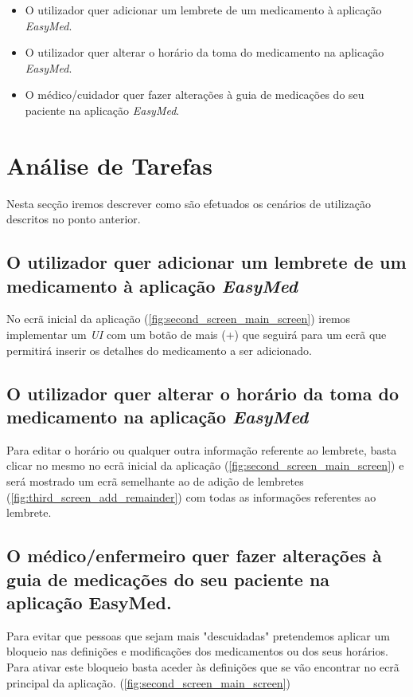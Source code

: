 \documentclass[a4paper]{article}
\begin{document}
\begin{itemize}
    \item O utilizador quer adicionar um lembrete de um medicamento à aplicação \textit{EasyMed}.
    \item O utilizador quer alterar o horário da toma do medicamento na aplicação \textit{EasyMed}.
    \item O médico/cuidador quer fazer alterações à guia de medicações do seu paciente na aplicação \textit{EasyMed}.
\end{itemize}

\section{Análise de Tarefas}\label{section:chores_analysis}
Nesta secção iremos descrever como são efetuados os cenários de utilização descritos no ponto anterior.

\subsection{O utilizador quer adicionar um lembrete de um medicamento à aplicação \textit{EasyMed}}
No ecrã inicial da aplicação (\ref{fig:second_screen_main_screen}) iremos implementar um \textit{UI} com um botão de mais (+) que seguirá para um ecrã que permitirá inserir os detalhes do medicamento a ser adicionado.

\subsection{O utilizador quer alterar o horário da toma do medicamento na aplicação \textit{EasyMed}}
Para editar o horário ou qualquer outra informação referente ao lembrete, basta clicar no mesmo no ecrã inicial da aplicação (\ref{fig:second_screen_main_screen}) e será mostrado um ecrã semelhante ao de adição de lembretes (\ref{fig:third_screen_add_remainder}) com todas as informações referentes ao lembrete.

\subsection{O médico/enfermeiro quer fazer alterações à guia de medicações do seu paciente na aplicação EasyMed.}
Para evitar que pessoas que sejam mais "descuidadas" pretendemos aplicar um bloqueio nas definições e modificações dos medicamentos ou dos seus horários.
Para ativar este bloqueio basta aceder às definições que se vão encontrar no ecrã principal da aplicação. (\ref{fig:second_screen_main_screen})
\end{document}
